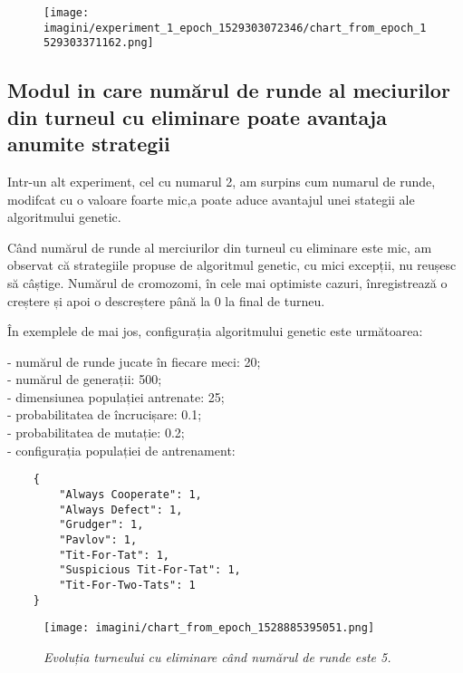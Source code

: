 \begin{figure}[H]
	\centering
	\texttt{[image: imagini/experiment\_1\_epoch\_1529303072346/chart\_from\_epoch\_1529303371162.png]}
\end{figure}

\subsection {Modul in care numărul de runde al meciurilor din turneul cu eliminare poate avantaja anumite strategii}

Intr-un alt experiment, cel cu numarul 2, am surpins cum numarul de runde, modifcat cu o valoare foarte mic,a poate aduce avantajul unei stategii ale algoritmului genetic.

Când numărul de runde al merciurilor din turneul cu eliminare este mic, am observat că strategiile propuse de algoritmul genetic, cu mici excepții, nu reușesc să câștige. Numărul de cromozomi, în cele mai optimiste cazuri, înregistrează o creștere și apoi o descreștere până la 0 la final de turneu. 

În exemplele de mai jos, configurația algoritmului genetic este următoarea: 

- numărul de runde jucate în fiecare meci: 20;\\
- numărul de generații: 500;\\
- dimensiunea populației antrenate: 25;\\
- probabilitatea de încrucișare: 0.1;\\
- probabilitatea de mutație: 0.2;\\
- configurația populației de antrenament:\\
\begin{center}
	\begin{lstlisting}
	{
		"Always Cooperate": 1,
		"Always Defect": 1,
		"Grudger": 1,
		"Pavlov": 1,
		"Tit-For-Tat": 1,
		"Suspicious Tit-For-Tat": 1,
		"Tit-For-Two-Tats": 1
	}
\end{lstlisting}
\end{center}

\begin{figure}[H]
	\centering
	\texttt{[image: imagini/chart\_from\_epoch\_1528885395051.png]}
	\caption{\textit{Evoluția turneului cu eliminare când numărul de runde este 5.}}
	\label{fig:evolutia_cand_numarul_de_runde_este_5}
\end{figure}

